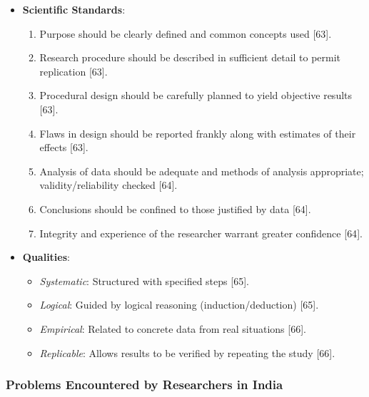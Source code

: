 \documentclass[
]{article}
\providecommand{\tightlist}{%
  \setlength{\itemsep}{0pt}\setlength{\parskip}{0pt}}
\begin{document}
\begin{itemize}
\tightlist
\item
  \textbf{Scientific Standards}:

  \begin{enumerate}
  \def\labelenumi{\arabic{enumi}.}
  \tightlist
  \item
    Purpose should be clearly defined and common concepts used {[}63{]}.
  \item
    Research procedure should be described in sufficient detail to
    permit replication {[}63{]}.
  \item
    Procedural design should be carefully planned to yield objective
    results {[}63{]}.
  \item
    Flaws in design should be reported frankly along with estimates of
    their effects {[}63{]}.
  \item
    Analysis of data should be adequate and methods of analysis
    appropriate; validity/reliability checked {[}64{]}.
  \item
    Conclusions should be confined to those justified by data {[}64{]}.
  \item
    Integrity and experience of the researcher warrant greater
    confidence {[}64{]}.
  \end{enumerate}
\item
  \textbf{Qualities}:

  \begin{itemize}
  \tightlist
  \item
    \emph{Systematic}: Structured with specified steps {[}65{]}.
  \item
    \emph{Logical}: Guided by logical reasoning (induction/deduction)
    {[}65{]}.
  \item
    \emph{Empirical}: Related to concrete data from real situations
    {[}66{]}.
  \item
    \emph{Replicable}: Allows results to be verified by repeating the
    study {[}66{]}.
  \end{itemize}
\end{itemize}

\subsubsection{Problems Encountered by Researchers in
India}\label{problems-encountered-by-researchers-in-india}
\end{document}
